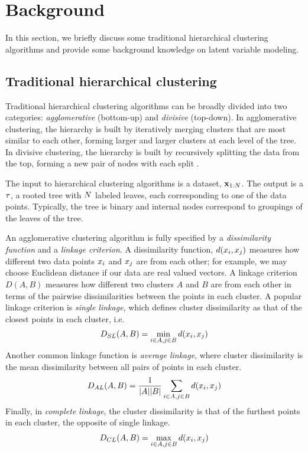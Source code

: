 \section{Background}

In this section, we briefly discuss
some traditional hierarchical clustering algorithms
and provide some
background knowledge on latent variable modeling.

\subsection{Traditional hierarchical clustering}
Traditional hierarchical clustering algorithms
can be broadly divided into two categories:
\emph{agglomerative} (bottom-up) and \emph{divisive} (top-down).
In agglomerative clustering, the hierarchy
is built by iteratively merging clusters
that are most similar to each other, forming
larger and larger clusters at each level
of the tree.
In divisive clustering,
the hierarchy is built by recursively
splitting the data from the top,
forming a new pair of nodes with 
each split \citep{Hastie2009}.

The input to hierarchical clustering algorithms
is a dataset, $\mathbf{x}_{1:N}$.
The output is a $\tau$,
a rooted tree with $N$
labeled leaves,
each corresponding to one of the data points.
Typically, the tree is binary
and internal nodes correspond
to groupings of the leaves
of the tree.

An agglomerative clustering algorithm is fully specified
by a \emph{dissimilarity function} and a \emph{linkage criterion}.
A dissimilarity function,
$d(x_i, x_j)$ measures
how different two data points $x_i$ and $x_j$ are from each other;
for example, we may choose Euclidean distance 
if our data are real valued vectors.
A linkage criterion $D(A, B)$ measures how different two clusters
$A$ and $B$
are from each other in terms of the pairwise
dissimilarities between the points in each cluster.
A popular linkage criterion is
\emph{single linkage}, which defines
cluster dissimilarity
as that
of the closest points in 
each cluster,
i.e.
\begin{align}
  D_{SL}(A, B) = \min_{i\in A, j \in B} d(x_i, x_j)
\end{align}
Another common linkage function is \emph{average linkage}, 
where cluster dissimilarity is
the mean dissimilarity between
all pairs of points in each cluster.
\begin{align}
  D_{AL}(A, B) = \frac{1}{|A||B|}\sum_{i\in A, j \in B} d(x_i, x_j)
\end{align}
Finally, in \emph{complete linkage}, the cluster
dissimilarity
is that of the furthest points in each cluster,
the opposite of single linkage.
\begin{align}
  D_{CL}(A, B) = \max_{i\in A, j \in B} d(x_i, x_j)
\end{align}

